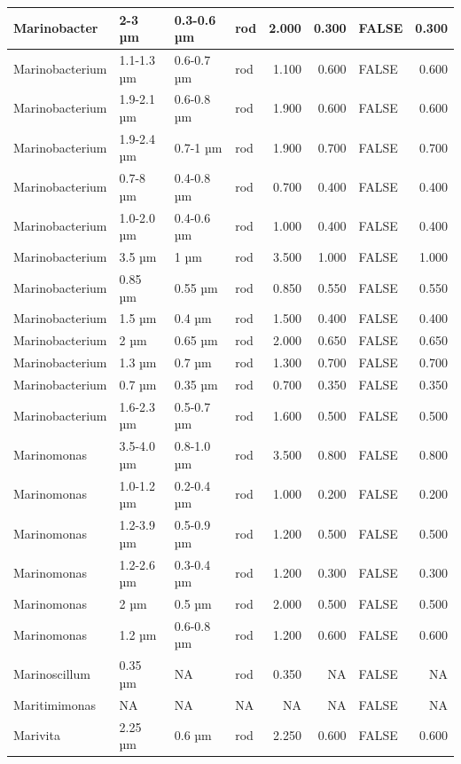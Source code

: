 \documentclass[
]{article}
\begin{document}
\begin{table}
\begin{tabular}{l|l|l|l|r|r|l|r}
\hline
Marinobacter & 2-3 µm & 0.3-0.6 µm & rod & 2.000 & 0.300 & FALSE & 0.300\\
\hline
Marinobacterium & 1.1-1.3 µm & 0.6-0.7 µm & rod & 1.100 & 0.600 & FALSE & 0.600\\
\hline
Marinobacterium & 1.9-2.1 µm & 0.6-0.8 µm & rod & 1.900 & 0.600 & FALSE & 0.600\\
\hline
Marinobacterium & 1.9-2.4 µm & 0.7-1 µm & rod & 1.900 & 0.700 & FALSE & 0.700\\
\hline
Marinobacterium & 0.7-8 µm & 0.4-0.8 µm & rod & 0.700 & 0.400 & FALSE & 0.400\\
\hline
Marinobacterium & 1.0-2.0 µm & 0.4-0.6 µm & rod & 1.000 & 0.400 & FALSE & 0.400\\
\hline
Marinobacterium & 3.5 µm & 1 µm & rod & 3.500 & 1.000 & FALSE & 1.000\\
\hline
Marinobacterium & 0.85 µm & 0.55 µm & rod & 0.850 & 0.550 & FALSE & 0.550\\
\hline
Marinobacterium & 1.5 µm & 0.4 µm & rod & 1.500 & 0.400 & FALSE & 0.400\\
\hline
Marinobacterium & 2 µm & 0.65 µm & rod & 2.000 & 0.650 & FALSE & 0.650\\
\hline
Marinobacterium & 1.3 µm & 0.7 µm & rod & 1.300 & 0.700 & FALSE & 0.700\\
\hline
Marinobacterium & 0.7 µm & 0.35 µm & rod & 0.700 & 0.350 & FALSE & 0.350\\
\hline
Marinobacterium & 1.6-2.3 µm & 0.5-0.7 µm & rod & 1.600 & 0.500 & FALSE & 0.500\\
\hline
Marinomonas & 3.5-4.0 µm & 0.8-1.0 µm & rod & 3.500 & 0.800 & FALSE & 0.800\\
\hline
Marinomonas & 1.0-1.2 µm & 0.2-0.4 µm & rod & 1.000 & 0.200 & FALSE & 0.200\\
\hline
Marinomonas & 1.2-3.9 µm & 0.5-0.9 µm & rod & 1.200 & 0.500 & FALSE & 0.500\\
\hline
Marinomonas & 1.2-2.6 µm & 0.3-0.4 µm & rod & 1.200 & 0.300 & FALSE & 0.300\\
\hline
Marinomonas & 2 µm & 0.5 µm & rod & 2.000 & 0.500 & FALSE & 0.500\\
\hline
Marinomonas & 1.2 µm & 0.6-0.8 µm & rod & 1.200 & 0.600 & FALSE & 0.600\\
\hline
Marinoscillum & 0.35 µm & NA & rod & 0.350 & NA & FALSE & NA\\
\hline
Maritimimonas & NA & NA & NA & NA & NA & FALSE & NA\\
\hline
Marivita & 2.25 µm & 0.6 µm & rod & 2.250 & 0.600 & FALSE & 0.600\\

\end{tabular}
\end{table}
\end{document}
